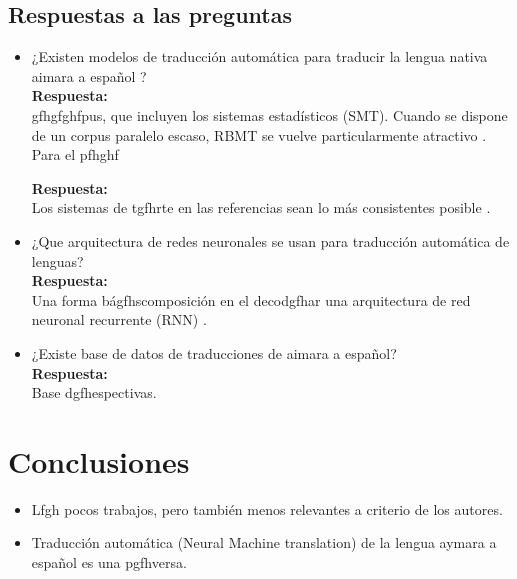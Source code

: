 \documentclass[letterpaper]{article}
\begin{document}
	\subsection{Respuestas a las preguntas }
	\begin{itemize}
	    \item ¿Existen modelos de traducción automática para traducir la lengua nativa aimara a español ?\\
	    
	    \textbf{Respuesta:}\\
	    gfhgfghfpus, que incluyen los sistemas estadísticos (SMT). Cuando se dispone de un corpus paralelo escaso, RBMT se vuelve particularmente atractivo \cite{10.1145/2738045}.\\
	    Para el pfhghf
	    
	    \textbf{Respuesta:}\\
	    Los sistemas de tgfhrte en las referencias sean lo más consistentes posible \cite{10.1109/TASLP.2020.3042006} \cite{8614221}.
	    \item ¿Que arquitectura de redes neuronales se usan para traducción automática de lenguas?\\
	    
	    \textbf{Respuesta:}\\
	    Una forma bágfhscomposición en el decodgfhar una arquitectura de red neuronal recurrente (RNN) \cite{DBLP:journals/corr/LuongPM15} \cite{DBLP:journals/corr/JeanCMB14}.
	    \item ¿Existe base de datos de traducciones de aimara a español?\\
	    
	    \textbf{Respuesta:}\\
	    Base dgfhespectivas.
	\end{itemize}
	\section{Conclusiones}
	\begin{itemize}
	    \item Lfgh pocos trabajos, pero también menos relevantes a criterio de los autores.
	    \item Traducción automática (Neural Machine translation) de la lengua aymara a español es una pgfhversa.  
	\end{itemize}
	
	\printbibliography[heading=bibintoc]
	
\end{document}
